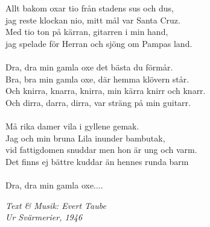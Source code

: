 \vspace{10pt}
Allt bakom oxar tio från stadens sus och dus,\\
jag reste klockan nio, mitt mål var Santa Cruz.\\
Med tio ton på kärran, gitarren i min hand,\\
jag spelade för Herran och sjöng om Pampas land.\\
\\
Dra, dra min gamla oxe det bästa du förmår.\\
Bra, bra min gamla oxe, där hemma klövern står.\\
Och knirra, knarra, knirra, min kärra knirr och knarr.\\
Och dirra, darra, dirra, var sträng på min guitarr.\\
\\
Må rika damer vila i gyllene gemak.\\
Jag och min bruna Lila inunder bambutak,\\
vid fattigdomen snuddar men hon är ung och varm.\\
Det finns ej bättre kuddar än hennes runda barm\\
\\
Dra, dra min gamla oxe....
\par
\vspace{10pt}
{\footnotesize\textit{Text & Musik: Evert Taube\\Ur Svärmerier, 1946}}
